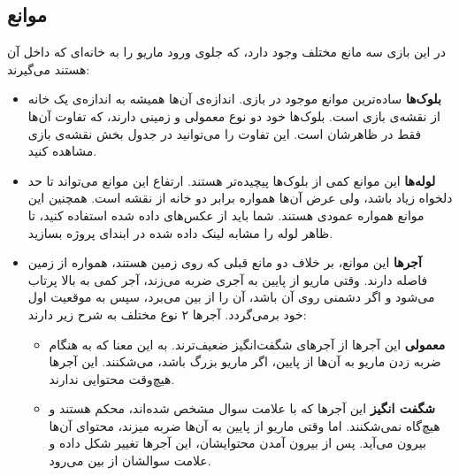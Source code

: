 \documentclass{utap}
\begin{document}
	\subsection{موانع}
در این بازی سه مانع مختلف وجود دارد، که جلوی ورود ماریو را به خانه‌ای که داخل آن هستند می‌گیرند:
	\begin{itemize}
		\item
\textbf{بلوک‌ها}
ساده‌ترین موانع موجود در بازی. اندازه‌ی آن‌ها همیشه به اندازه‌ی یک خانه‌ از نقشه‌ی بازی است. بلوک‌ها خود دو نوع معمولی و زمینی دارند، که تفاوت آن‌ها فقط در ظاهرشان است. این تفاوت را می‌توانید در جدول بخش نقشه‌ی بازی مشاهده کنید.
		\item
\textbf{لوله‌ها}
این موانع کمی از بلوک‌ها پیچیده‌تر هستند. ارتفاع این موانع می‌تواند تا حد دلخواه زیاد باشد، ولی عرض آن‌ها همواره برابر دو خانه‌ از نقشه است. همچنین این موانع همواره عمودی هستند. شما باید از عکس‌های داده شده استفاده کنید، تا ظاهر لوله را مشابه لینک داده شده در ابندای پروژه بسازید.
		\item
\textbf{آجرها}
این موانع، بر خلاف دو مانع قبلی که روی زمین هستند، همواره از زمین فاصله دارند. وقتی ماریو از پایین به آجری ضربه می‌زند، آجر کمی به بالا پرتاب می‌شود و اگر دشمنی روی آن‌ باشد، آن را از بین می‌برد، سپس به موقعیت اول خود برمی‌گردد. آجرها ۲ نوع مختلف به شرح زیر دارند:
		\begin{itemize}
			\item
\textbf{معمولی}
این آجرها از آجر‌های شگفت‌انگیز ضعیف‌ترند. به این معنا که به هنگام ضربه زدن ماریو به آن‌ها از پایین، اگر ماریو بزرگ باشد، می‌شکنند. این آجر‌ها هیچ‌وقت محتوایی ندارند.
			\item
\textbf{شگفت انگیز}
این آجرها که با علامت سوال مشخص شده‌اند، محکم هستند و هیچ‌گاه نمی‌شکنند. اما وقتی ماریو از پایین به آن‌ها ضربه میزند، محتوای آن‌ها بیرون می‌آید. پس از بیرون آمدن محتوایشان،‌ این آجر‌ها تغییر شکل داده و علامت سوالشان از بین می‌رود.
		\end{itemize}
	\end{itemize}
\end{document}
